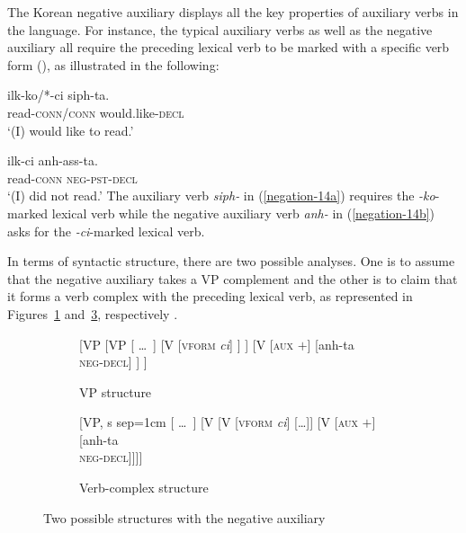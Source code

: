 \documentclass[output=paper
                ,modfonts
                ,nonflat
	        ,collection
	        ,collectionchapter
	        ,collectiontoclongg
 	        ,biblatex
                ,babelshorthands
                ,newtxmath
                ,draftmode
                ,colorlinks, citecolor=brown
]{./langsci/langscibook}
\begin{document}
{\begin{exe}
\begin{xlist}
\begin{exe}
\begin{xlist}
%
The Korean negative auxiliary displays all the key properties of auxiliary verbs in the language. For instance, the typical auxiliary verbs as
well as the negative auxiliary all require the preceding lexical verb to be marked with a specific verb form (\vform), as illustrated
in the following:

\eal
\ex\label{negation-14a}
\gll ilk-ko/*-ci siph-ta. \\
     read-\textsc{conn}/\textsc{conn} would.like-\textsc{decl} \\
\glt `(I) would like to read.'

\ex\label{negation-14b}
\gll ilk-ci anh-ass-ta. \\
     read-\textsc{conn} \textsc{neg}-\textsc{pst}-\textsc{decl} \\
\glt `(I) did not read.'
\zl
\noindent
The auxiliary verb \textit{siph-} in (\ref{negation-14a}) requires the
\textit{-ko}-marked lexical verb while the negative auxiliary
 verb \textit{anh-} in (\ref{negation-14b}) asks for the \textit{-ci}-marked lexical verb.

In terms of syntactic structure, there
are two possible analyses.  One is to assume that the negative auxiliary takes a VP complement and the other is to claim that it forms a verb complex with the preceding lexical verb, as represented in Figures~\ref{negation-fig:3a} and~\ref{negation-fig:3b}, respectively
\citep{Chung98a-u, Kim:16}.
%
\begin{figure}
	\begin{subfigure}[b]{0.48\textwidth}
\centering
		\begin{forest}
			[VP
				[VP
					[ \dots\ ]
					[V {[\textsc{vform} \textit{ci}]}
					]
					]
				[V {[\textsc{aux $+$}]}
					[anh-ta\\ \textsc{neg-decl}]
				]
			]	
		\end{forest}
	\caption{VP structure}\label{negation-fig:3a}
		\end{subfigure}	
\hfill
	\begin{subfigure}[b]{0.48\textwidth}
\centering
		\begin{forest}
			[VP, s sep=1cm
				[ \dots\ ]
				[V
					[V {[\textsc{vform} \textit{ci}]}
						[\dots]]
					[V {[\textsc{aux $+$}]}
						[anh-ta\\ \textsc{neg-decl}]]]]
		\end{forest}
	\caption{Verb-complex structure}\label{negation-fig:3b}	
		\end{subfigure}
	\caption{Two possible structures with the negative auxiliary}
\end{figure}


\end{xlist}
\end{exe}
\end{xlist}
\end{exe}}
\end{document}
